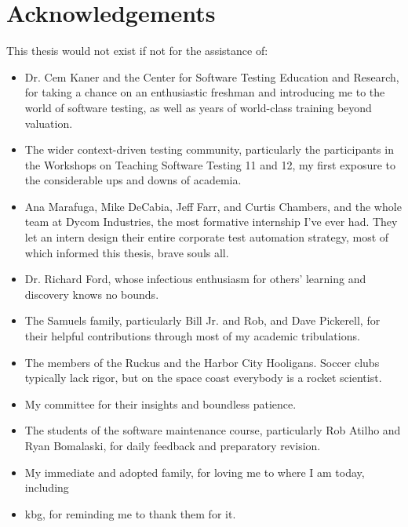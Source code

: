 \chapter*{Acknowledgements}
This thesis would not exist if not for the assistance of:
\begin{itemize}
    \item Dr. Cem Kaner and the Center for Software Testing Education and Research, for taking a chance on an enthusiastic freshman and introducing me to the world of software testing, as well as years of world-class training beyond valuation.

    \item The wider context-driven testing community, particularly the participants in the Workshops on Teaching Software Testing 11 and 12, my first exposure to the considerable ups and downs of academia.

    \item Ana Marafuga, Mike DeCabia, Jeff Farr, and Curtis Chambers, and the whole team at Dycom Industries, the most formative internship I've ever had. They let an intern design their entire corporate test automation strategy, most of which informed this thesis, brave souls all.

    \item Dr. Richard Ford, whose infectious enthusiasm for others' learning and discovery knows no bounds.

    \item The Samuels family, particularly Bill Jr. and Rob, and Dave Pickerell, for their helpful contributions through most of my academic tribulations.

    \item The members of the Ruckus and the Harbor City Hooligans. Soccer clubs typically lack rigor, but on the space coast everybody is a rocket scientist.

    \item My committee for their insights and boundless patience.

    \item The students of the software maintenance course, particularly Rob Atilho and Ryan Bomalaski, for daily feedback and preparatory revision.

    \item My immediate and adopted family, for loving me to where I am today, including

    \item kbg, for reminding me to thank them for it.
\end{itemize}
